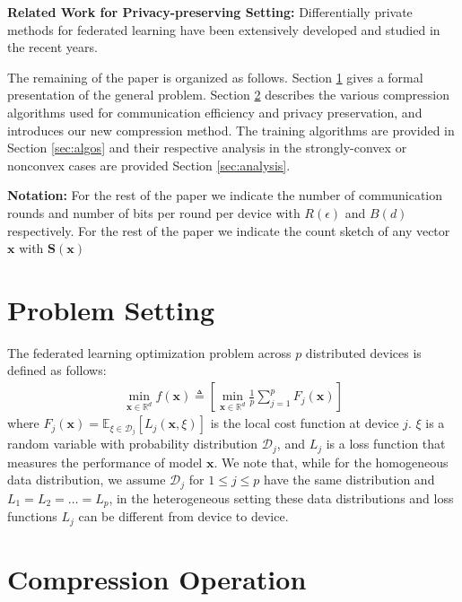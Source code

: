 \documentclass[review,onefignum,onetabnum]{siamart190516}
\begin{document}
\textbf{Related Work for Privacy-preserving Setting:} Differentially private methods for federated learning have been extensively developed and studied in the recent years. 



The remaining of the paper is organized as follows.
Section \ref{sec:problem} gives a formal presentation of the general problem. 
Section \ref{sec:compression} describes the various compression algorithms used for communication efficiency and privacy preservation, and introduces our new compression method.
The training algorithms are provided in Section \ref{sec:algos} and their respective analysis in the strongly-convex or nonconvex cases are provided Section \ref{sec:analysis}.

\textbf{Notation:} For the rest of the paper we indicate the number of communication rounds and number of bits per round per device with $R(\epsilon)$ and $B(d)$ respectively. For the rest of the paper we indicate the count sketch of any vector $\boldsymbol{x}$ with $\mathbf{S}(\boldsymbol{x})$
 
\section{Problem Setting}\label{sec:problem}
The federated learning optimization problem across $p$ distributed devices is defined as follows:
\begin{align}\label{eq:main}
   \min_{\boldsymbol{x}\in \mathbb{R}^{d}} f(\boldsymbol{x})\triangleq \left[\min_{\boldsymbol{x}\in \mathbb{R}^{d}}\frac{1}{p}\sum_{j=1}^{p}F_j(\boldsymbol{x})\right]
\end{align}
where $F_j(\boldsymbol{x})=\mathbb{E}_{\xi\in\mathcal{D}_j}\left[L_j\left(\boldsymbol{x},\xi\right)\right]$ is the local cost function at device $j$.
$\xi$ is a random variable with probability distribution $\mathcal{D}_j$, and $L_j$ is a loss function that measures the performance of model $\boldsymbol{x}$. 
We note that, while for the homogeneous data distribution, we assume $\mathcal{D}_j$ for $1\leq j\leq p$ have the same distribution and $L_1=L_2=\ldots=L_p$, in the heterogeneous setting these data distributions and loss functions $L_j$ can be different from device to device. 


\section{Compression Operation}\label{sec:compression}
\end{document}

